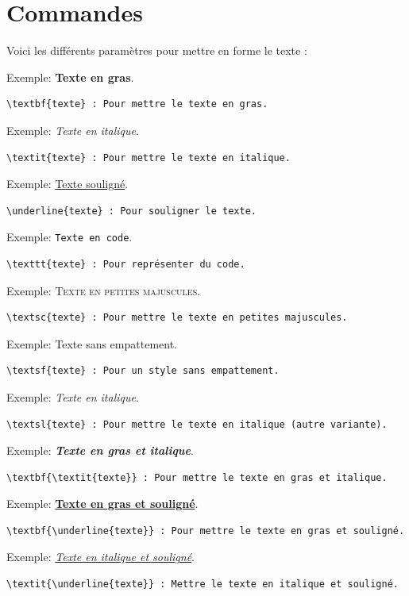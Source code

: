 \newpage
\chapter{Commandes}


Voici les différents paramètres pour mettre en forme le texte : 

Exemple: \textbf{Texte en gras}.
\begin{verbatim}
\textbf{texte} : Pour mettre le texte en gras.
\end{verbatim}

Exemple: \textit{Texte en italique}.
\begin{verbatim}
\textit{texte} : Pour mettre le texte en italique.
\end{verbatim}

Exemple: \underline{Texte souligné}.
\begin{verbatim}
\underline{texte} : Pour souligner le texte.
\end{verbatim}

Exemple: \texttt{Texte en code}.
\begin{verbatim}
\texttt{texte} : Pour représenter du code.
\end{verbatim}

Exemple: \textsc{Texte en petites majuscules}.
\begin{verbatim}
\textsc{texte} : Pour mettre le texte en petites majuscules.
\end{verbatim}

Exemple: \textsf{Texte sans empattement}.
\begin{verbatim}
\textsf{texte} : Pour un style sans empattement.
\end{verbatim}

Exemple: \textsl{Texte en italique}.
\begin{verbatim}
\textsl{texte} : Pour mettre le texte en italique (autre variante).
\end{verbatim}

Exemple: \textbf{\textit{Texte en gras et italique}}.
\begin{verbatim}
\textbf{\textit{texte}} : Pour mettre le texte en gras et italique.
\end{verbatim}

Exemple: \textbf{\underline{Texte en gras et souligné}}.
\begin{verbatim}
\textbf{\underline{texte}} : Pour mettre le texte en gras et souligné.
\end{verbatim}

Exemple: \textit{\underline{Texte en italique et souligné}}.
\begin{verbatim}
\textit{\underline{texte}} : Mettre le texte en italique et souligné.
\end{verbatim}

